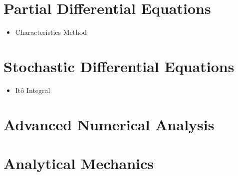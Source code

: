 \documentclass[10pt]{article}
\begin{document}
\section{Partial Differential Equations}
\begin{itemize}
	\item Characteristics Method
\end{itemize}
\begin{refsection}
	\nocite{salsa2016equazioni}
	\nocite{salsa2016partial}
\printbibliography[heading=subbibliography]
\end{refsection}

\section{Stochastic Differential Equations}
\begin{itemize}
	\item It\^o Integral
	\end{itemize}
\section{Advanced Numerical Analysis}
\section{Analytical Mechanics}
\end{document}
